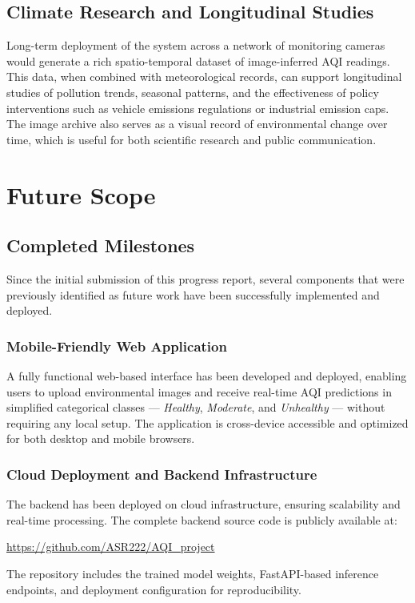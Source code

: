 \documentclass[conference]{IEEEtran}
\begin{document}
\subsection{Climate Research and Longitudinal Studies}

Long-term deployment of the system across a network of monitoring cameras
would generate a rich spatio-temporal dataset of image-inferred AQI
readings. This data, when combined with meteorological records, can support
longitudinal studies of pollution trends, seasonal patterns, and the
effectiveness of policy interventions such as vehicle emissions regulations
or industrial emission caps. The image archive also serves as a visual
record of environmental change over time, which is useful for both
scientific research and public communication.

\section{Future Scope}
\label{sec:future}

\subsection{Completed Milestones}

Since the initial submission of this progress report, several components that
were previously identified as future work have been successfully implemented
and deployed.

\subsubsection{Mobile-Friendly Web Application}
A fully functional web-based interface has been developed and deployed,
enabling users to upload environmental images and receive real-time AQI
predictions in simplified categorical classes --- \textit{Healthy},
\textit{Moderate}, and \textit{Unhealthy} --- without requiring any local
setup. The application is cross-device accessible and optimized for both
desktop and mobile browsers.

\subsubsection{Cloud Deployment and Backend Infrastructure}
The backend has been deployed on cloud infrastructure, ensuring scalability
and real-time processing. The complete backend source code is publicly
available at:
\begin{center}
  \url{https://github.com/ASR222/AQI_project}
\end{center}
The repository includes the trained model weights, FastAPI-based inference
endpoints, and deployment configuration for reproducibility.
\end{document}
